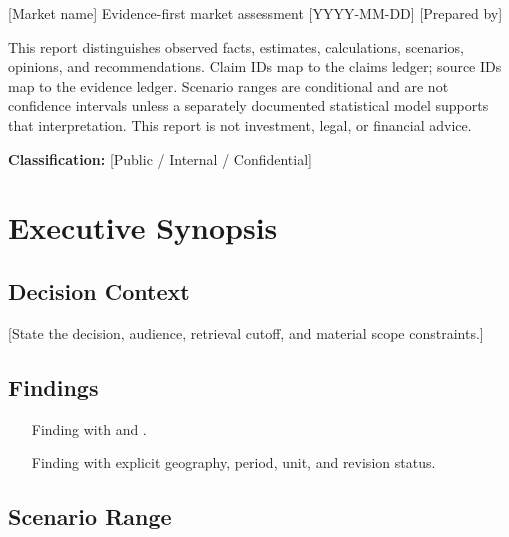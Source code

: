 \documentclass[11pt,letterpaper]{report}
\newcommand{\reporttitle}{[Market name]}
\newcommand{\reportsubtitle}{Evidence-first market assessment}
\newcommand{\retrievalcutoff}{[YYYY-MM-DD]}
\newcommand{\reportauthor}{[Prepared by]}
\newcommand{\reportclassification}{[Public / Internal / Confidential]}
\begin{document}
\makemarketreporttitle
  {\reporttitle}
  {\reportsubtitle}
  {\retrievalcutoff}
  {\reportauthor}


\begin{calloutbox}
This report distinguishes observed facts, estimates, calculations, scenarios,
opinions, and recommendations. Claim IDs map to the claims ledger; source IDs
map to the evidence ledger. Scenario ranges are conditional and are not
confidence intervals unless a separately documented statistical model supports
that interpretation. This report is not investment, legal, or financial advice.
\end{calloutbox}

\textbf{Classification:} \reportclassification

\tableofcontents
\clearpage
{}

\chapter{Executive Synopsis}

\section{Decision Context}
[State the decision, audience, retrieval cutoff, and material scope constraints.]

\section{Findings}
\begin{evidencebox}
\begin{itemize}
  \item [Finding with \claimref{C-001} and \sourceref{S-001}.]
  \item [Finding with explicit geography, period, unit, and revision status.]
\end{itemize}
\end{evidencebox}

\section{Scenario Range}
\begin{calculationbox}
\end{calculationbox}
\end{document}
